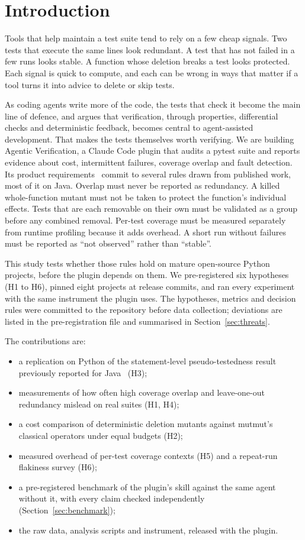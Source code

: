 \section{Introduction}

Tools that help maintain a test suite tend to rely on a few cheap signals. Two tests that execute the same lines look redundant. A test that has not failed in a few runs looks stable. A function whose deletion breaks a test looks protected. Each signal is quick to compute, and each can be wrong in ways that matter if a tool turns it into advice to delete or skip tests.

As coding agents write more of the code, the tests that check it become the main line of defence, and \citet{osmani2026verification} argues that verification, through properties, differential checks and deterministic feedback, becomes central to agent-assisted development. That makes the tests themselves worth verifying. We are building Agentic Verification, a Claude Code plugin that audits a pytest suite and reports evidence about cost, intermittent failures, coverage overlap and fault detection. Its product requirements~\cite{tsaprd} commit to several rules drawn from published work, most of it on Java. Overlap must never be reported as redundancy. A killed whole-function mutant must not be taken to protect the function's individual effects. Tests that are each removable on their own must be validated as a group before any combined removal. Per-test coverage must be measured separately from runtime profiling because it adds overhead. A short run without failures must be reported as ``not observed'' rather than ``stable''.

This study tests whether those rules hold on mature open-source Python projects, before the plugin depends on them. We pre-registered six hypotheses (H1 to H6), pinned eight projects at release commits, and ran every experiment with the same instrument the plugin uses. The hypotheses, metrics and decision rules were committed to the repository before data collection; deviations are listed in the pre-registration file and summarised in Section~\ref{sec:threats}.

The contributions are:
\begin{itemize}
  \item a replication on Python of the statement-level pseudo-testedness result previously reported for Java~\cite{maton2024pseudo} (H3);
  \item measurements of how often high coverage overlap and leave-one-out redundancy mislead on real suites (H1, H4);
  \item a cost comparison of deterministic deletion mutants against mutmut's classical operators under equal budgets (H2);
  \item measured overhead of per-test coverage contexts (H5) and a repeat-run flakiness survey (H6);
  \item a pre-registered benchmark of the plugin's skill against the same agent without it, with every claim checked independently (Section~\ref{sec:benchmark});
  \item the raw data, analysis scripts and instrument, released with the plugin.
\end{itemize}
